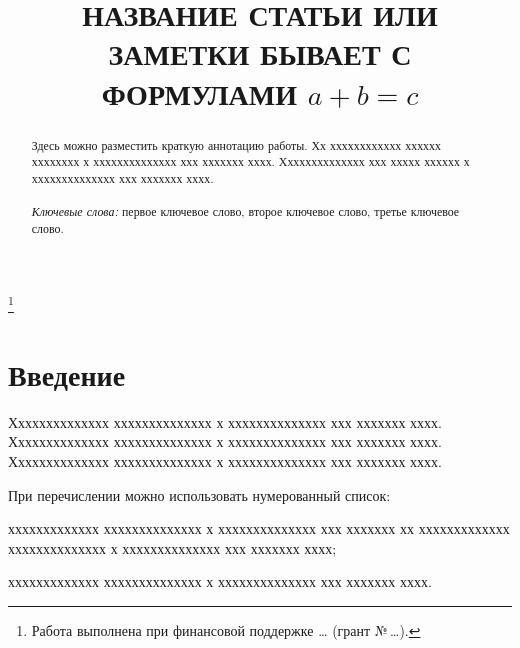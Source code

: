 \documentclass[12pt]{a&t}
\begin{document}

\title{НАЗВАНИЕ СТАТЬИ ИЛИ ЗАМЕТКИ БЫВАЕТ С ФОРМУЛАМИ $a+b=c$}%
\thanks{Работа выполнена при финансовой поддержке \dots
(грант \mbox{№\,\dots}).}


\maketitle

\begin{abstract}
Здесь можно разместить краткую аннотацию работы. Хх
хххххххххххх хххххх хххххххх х хххххххххххххх ххх ххххххх хххх.
Хххххххххххххх ххх ххххх хххххх х хххххххххххххх ххх ххххххх
хххх.\\
\\
\textit{Ключевые слова:} первое ключевое слово, второе ключевое слово, третье ключевое слово.
\end{abstract}



\section{Введение}

Хххххххххххххх хххххххххххххх х хххххххххххххх ххх ххххххх хххх.
Хххххххххххххх хххххххххххххх х хххххххххххххх ххх ххххххх хххх.
Хххххххххххххх хххххххххххххх х хххххххххххххх ххх ххххххх хххх.

При перечислении можно использовать нумерованный список:
\begin{enumlist} %
\item
ххххххххххххх хххххххххххххх х хххххххххххххх ххх ххххххх хх
ххххххххххххх хххххххххххххх х хххххххххххххх ххх ххххххх хххх;

\item
ххххххххххххх хххххххххххххх х хххххххххххххх ххх ххххххх хххх.
\end{enumlist}
\end{document}
